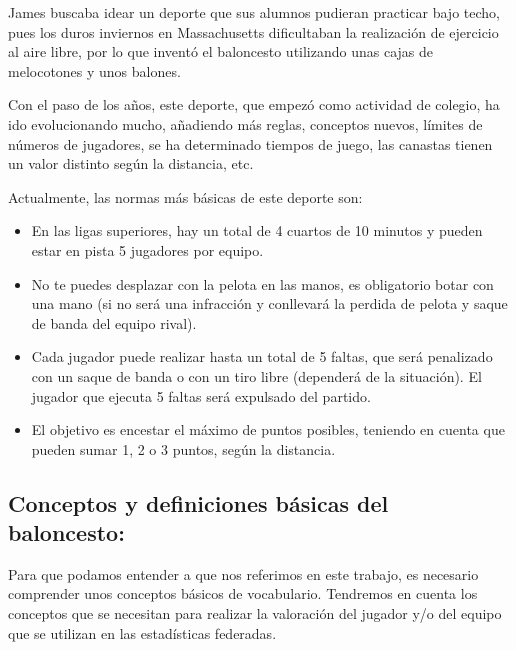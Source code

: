\documentclass[paper=a4, fontsize=9pt]{article}
\begin{document}
James buscaba idear un deporte que sus alumnos pudieran practicar bajo techo, pues los duros inviernos en Massachusetts dificultaban la realización de ejercicio al aire libre, por lo que inventó el baloncesto utilizando unas cajas de melocotones y unos balones.

Con el paso de los años, este deporte, que empezó como actividad de colegio, ha ido evolucionando mucho, añadiendo más reglas, conceptos nuevos, límites de números de jugadores, se ha determinado tiempos de juego, las canastas tienen un valor distinto según la distancia, etc.

Actualmente, las normas más básicas de este deporte son:

\begin{itemize}

\item En las ligas superiores, hay un total de 4 cuartos de 10 minutos y pueden estar en pista 5 jugadores por equipo.
\item No te puedes desplazar con la pelota en las manos, es obligatorio botar con una mano (si no será una infracción y conllevará la perdida de pelota y saque de banda del equipo rival).
\item Cada jugador puede realizar hasta un total de 5 faltas, que será penalizado con un saque de banda o con un tiro libre (dependerá de la situación). El jugador que ejecuta 5 faltas será expulsado del partido.
\item El objetivo es encestar el máximo de puntos posibles, teniendo en cuenta que pueden sumar 1, 2 o 3 puntos, según la distancia.

\end{itemize}

\clearpage

\subsection{Conceptos y definiciones básicas del baloncesto:}

Para que podamos entender a que nos referimos en este trabajo, es necesario comprender unos conceptos básicos de vocabulario. Tendremos en cuenta los conceptos que se necesitan para realizar la valoración del jugador y/o del equipo que se utilizan en las estadísticas federadas.
\end{document}
